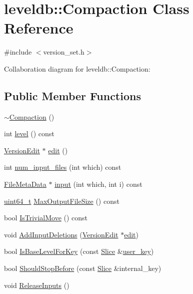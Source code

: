 \hypertarget{classleveldb_1_1_compaction}{\section{leveldb\-:\-:Compaction Class Reference}
\label{classleveldb_1_1_compaction}
}


{\ttfamily \#include $<$version\-\_\-set.\-h$>$}



Collaboration diagram for leveldb\-:\-:Compaction\-:
\subsection*{Public Member Functions}
\begin{DoxyCompactItemize}
\item 
\hyperlink{classleveldb_1_1_compaction_ad29d60feea9dd53f54a2bd9301dbd9c4}{$\sim$\-Compaction} ()
\item 
int \hyperlink{classleveldb_1_1_compaction_aaf72769cc8dabece3e513399425f91fa}{level} () const 
\item 
\hyperlink{classleveldb_1_1_version_edit}{Version\-Edit} $\ast$ \hyperlink{classleveldb_1_1_compaction_a122e4f7b4fdb6c0d1862624742b34b3d}{edit} ()
\item 
int \hyperlink{classleveldb_1_1_compaction_a75bcfebad0f838380ef7f63dc083e992}{num\-\_\-input\-\_\-files} (int which) const 
\item 
\hyperlink{structleveldb_1_1_file_meta_data}{File\-Meta\-Data} $\ast$ \hyperlink{classleveldb_1_1_compaction_a989d147c33f2993d4503c56ea0ee3a78}{input} (int which, int i) const 
\item 
\hyperlink{stdint_8h_aaa5d1cd013383c889537491c3cfd9aad}{uint64\-\_\-t} \hyperlink{classleveldb_1_1_compaction_a02ecf935a684691ef864a8997bfab793}{Max\-Output\-File\-Size} () const 
\item 
bool \hyperlink{classleveldb_1_1_compaction_a9d88e4a33ba63749cb0f0f04fbc74968}{Is\-Trivial\-Move} () const 
\item 
void \hyperlink{classleveldb_1_1_compaction_abb1acdc9b882a7497603b13386e7e1a7}{Add\-Input\-Deletions} (\hyperlink{classleveldb_1_1_version_edit}{Version\-Edit} $\ast$\hyperlink{classleveldb_1_1_compaction_a122e4f7b4fdb6c0d1862624742b34b3d}{edit})
\item 
bool \hyperlink{classleveldb_1_1_compaction_ae982beb6ee52d92de76a363ef0eefc29}{Is\-Base\-Level\-For\-Key} (const \hyperlink{classleveldb_1_1_slice}{Slice} \&\hyperlink{version__set_8cc_afced2118ae0bf03db7c7e75a21cfd004}{user\-\_\-key})
\item 
bool \hyperlink{classleveldb_1_1_compaction_a07624423bb512fedb358a008a38fa0b9}{Should\-Stop\-Before} (const \hyperlink{classleveldb_1_1_slice}{Slice} \&internal\-\_\-key)
\item 
void \hyperlink{classleveldb_1_1_compaction_a87ec90747d22dce0d103149db1ecf709}{Release\-Inputs} ()
\end{DoxyCompactItemize}
